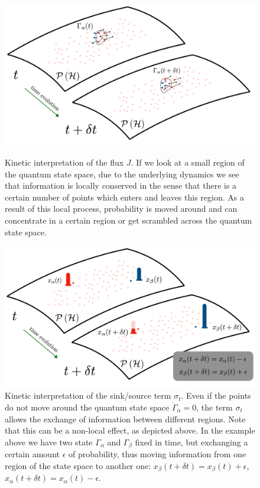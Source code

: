 \documentclass[draft,nofootinbib,pre,twocolumn,showpacs,showkeys,preprintnumbers,floatfix]{revtex4-1}
\newcommand{\1}{\mathbbm{1}}
\begin{document}
\begin{figure}[t!]
\centering
\begin{minipage}[t]{.45\textwidth}
\includegraphics[width=\textwidth]{./img/Flux.pdf}
\caption{Kinetic interpretation of the flux $J$. If we look at a small region of the quantum state space, 
	due to the underlying dynamics we see that information is locally conserved in the sense that 
	there is a certain number of points which enters and leaves this region. As a result of this local
	process, probability is moved around and can concentrate in a certain region or get scrambled 
	across the quantum state space.
	}
\label{fig:flux_term}
\end{minipage}\hfill
\begin{minipage}[t]{.45\textwidth}
\includegraphics[width=\textwidth]{./img/Source.pdf}
\caption{Kinetic interpretation of the sink/source term $\sigma_t$. Even if the points do not move around
	the quantum state space $\dot{\Gamma}_\alpha=0$, the term $\sigma_t$ allows the exchange of information 
	between different regions. Note that this can be a non-local effect, as depicted above. In the example above
	we have two state $\Gamma_\alpha$ and $\Gamma_\beta$ fixed in time, but exchanging a certain amount
	$\epsilon$ of probability, thus moving information from one region of the state space to another one: 
	$x_\beta(t+\delta t) = x_\beta(t)+\epsilon$, $x_\alpha(t+\delta t) 	= x_\alpha(t) - \epsilon$.
	}
\label{fig:sigma_term}
\end{minipage}
\end{figure}
\end{document}
